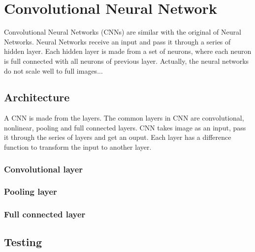 \chapter{Convolutional Neural Network}
Convolutional Neural Networks (CNNs) are similar with the original of Neural Networks. Neural Networks receive an input and pass it through a series of hidden layer. Each hidden layer is made from a set of neurons, where each neuron is full connected with all neurons of previous layer. Actually, the neural networks do not scale well to full images...
\section{Architecture}
A CNN is made from the layers. The common layers in CNN are convolutional, nonlinear, pooling and full connected layers. CNN takes image as an input, pass it through the series of layers and get an ouput. Each layer has a difference function to transform the input to another layer. 
\subsection{Convolutional layer}
\subsection{Pooling layer}
\subsection{Full connected layer}
\section{Testing}